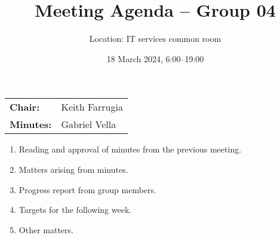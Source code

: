 \documentclass{cce2014-meetings}
\title{Meeting Agenda -- Group 04}
\author{Location: IT services common room}
\date{18 March 2024, 6:00--19:00}
\begin{document}
\maketitle
\begin{center}
        \begin{tabular}{ll}
                \textbf{Chair:}   & Keith Farrugia \\
                \textbf{Minutes:} & Gabriel Vella
        \end{tabular}
\end{center}

\begin{enumerate}

        \item Reading and approval of minutes from the previous meeting.

        \item Matters arising from minutes.

        \item Progress report from group members.

        \item Targets for the following week.

        \item Other matters.

\end{enumerate}
\end{document}
